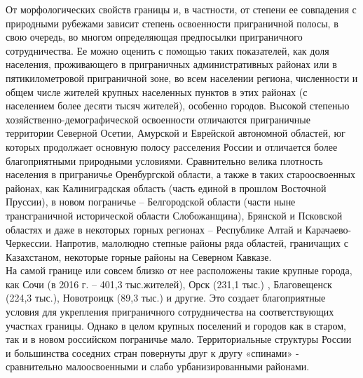 \documentclass[]{book}
\begin{document}
От морфологических свойств границы и, в частности, от степени ее
совпадения с природными рубежами зависит степень освоенности
приграничной полосы, в свою очередь, во многом определяющая предпосылки
приграничного сотрудничества. Ее можно оценить с помощью таких
показателей, как доля населения, проживающего в приграничных
административных районах или в пятикилометровой приграничной зоне, во
всем населении региона, численности и общем числе жителей крупных
населенных пунктов в этих районах (с населением более десяти тысяч
жителей), особенно городов. Высокой степенью
хозяйственно-демографической освоенности отличаются приграничные
территории Северной Осетии, Амурской и Еврейской автономной областей, юг
которых продолжает основную полосу расселения России и отличается более
благоприятными природными условиями. Сравнительно велика плотность
населения в приграничье Оренбургской области, а также в таких
староосвоенных районах, как Калиниградская область (часть единой в
прошлом Восточной Пруссии), в новом пограничье -- Белгородской области
(части ныне трансграничной исторической области Слобожанщина), Брянской
и Псковской областях и даже в некоторых горных регионах -- Республике
Алтай и Карачаево-Черкессии. Напротив, малолюдно степные районы ряда
областей, граничащих с Казахстаном, некоторые горные районы на Северном
Кавказе.\\
На самой границе или совсем близко от нее расположены такие крупные
города, как Сочи (в 2016 г. -- 401,3 тыс.жителей), Орск (231,1 тыс.) ,
Благовещенск (224,3 тыс.), Новотроицк (89,3 тыс.) и другие. Это создает
благоприятные условия для укрепления приграничного сотрудничества на
соответствующих участках границы. Однако в целом крупных поселений и
городов как в старом, так и в новом российском пограничье мало.
Территориальные структуры России и большинства соседних стран повернуты
друг к другу «спинами» - сравнительно малоосвоенными и слабо
урбанизированными районами.
\end{document}
